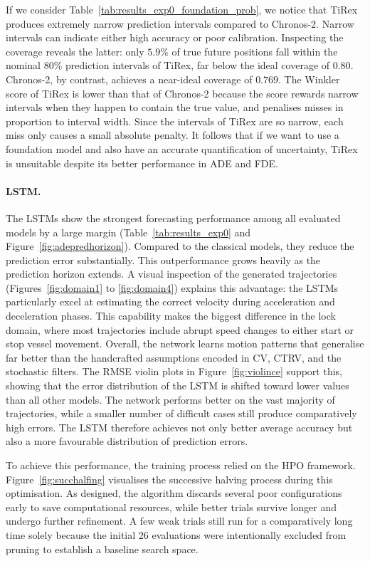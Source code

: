 If we consider Table~\ref{tab:results_exp0_foundation_prob}, we notice that TiRex produces extremely narrow prediction intervals compared to Chronos-2. Narrow intervals can indicate either high accuracy or poor calibration. Inspecting the coverage reveals the latter: only $5.9\%$ of true future positions fall within the nominal $80\%$ prediction intervals of TiRex, far below the ideal coverage of $0.80$.
Chronos-2, by contrast, achieves a near-ideal coverage of $0.769$.
The Winkler score of TiRex is lower than that of Chronos-2 because the score rewards narrow intervals when they happen to contain the true value, and penalises misses in proportion to interval width.
Since the intervals of TiRex are so narrow, each miss only causes a small absolute penalty.
It follows that if we want to use a foundation model and also have an accurate quantification of uncertainty, TiRex is unsuitable despite its better performance in ADE and FDE.


\paragraph{LSTM.}

The \acp{LSTM} show the strongest forecasting performance among all evaluated models by a large margin (Table~\ref{tab:results_exp0} and Figure~\ref{fig:adepredhorizon}).
Compared to the classical models, they reduce the prediction error substantially.
This outperformance grows heavily as the prediction horizon extends.
A visual inspection of the generated trajectories (Figures~\ref{fig:domain1} to \ref{fig:domain4}) explains this advantage: the \acp{LSTM} particularly excel at estimating the correct velocity during acceleration and deceleration phases.
This capability makes the biggest difference in the lock domain, where most trajectories include abrupt speed changes to either start or stop vessel movement.
Overall, the network learns motion patterns that generalise far better than the handcrafted assumptions encoded in \ac{CV}, \ac{CTRV}, and the stochastic filters.
The \ac{RMSE} violin plots in Figure~\ref{fig:violince} support this, showing that the error distribution of the \ac{LSTM} is shifted toward lower values than all other models.
The network performs better on the vast majority of trajectories, while a smaller number of difficult cases still produce comparatively high errors.
The \ac{LSTM} therefore achieves not only better average accuracy but also a more favourable distribution of prediction errors.

To achieve this performance, the training process relied on the \ac{HPO} framework.
Figure~\ref{fig:succhalfing} visualises the successive halving process during this optimisation.
As designed, the algorithm discards several poor configurations early to save computational resources, while better trials survive longer and undergo further refinement.
A few weak trials still run for a comparatively long time solely because the initial 26 evaluations were intentionally excluded from pruning to establish a baseline search space.

